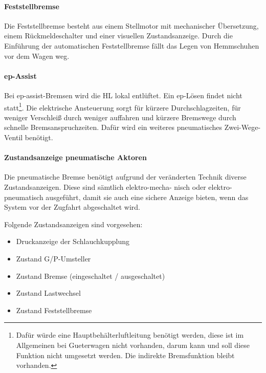 \paragraph{Feststellbremse} Die Feststellbremse besteht aus einem Stellmotor mit mechanischer Übersetzung, einem Rückmeldeschalter und einer visuellen Zustandsanzeige. Durch die Einführung der automatischen Feststellbremse fällt das Legen von \gls{Hemmschuh}en vor dem Wagen weg.

\paragraph{ep-Assist} Bei  \gls{ep-assist-Bremsen} wird die \gls{HL} lokal entlüftet. Ein ep-Lösen findet nicht statt\footnote{Dafür würde eine Hauptbehälterluftleitung benötigt werden, diese ist im Allgemeinen bei \gls{Gueterwagen} nicht vorhanden, darum kann und soll diese Funktion nicht umgesetzt werden. Die indirekte Bremsfunktion bleibt vorhanden.}.  Die elektrische Ansteuerung sorgt für kürzere Durchschlagzeiten, für weniger Verschleiß durch weniger auffahren und kürzere Bremswege durch schnelle Bremsanspruchzeiten. Dafür wird ein weiteres pneumatisches Zwei-Wege-Ventil benötigt.

\paragraph{Zustandsanzeige pneumatische Aktoren}\label{sec:ZustandKupplung}
Die pneumatische Bremse benötigt aufgrund der veränderten Technik diverse Zustandsanzeigen. Diese sind sämtlich elektro-mecha- nisch oder elektro-pneumatisch ausgeführt, damit sie auch eine sichere Anzeige bieten, wenn das System vor der \gls{Zugfahrt} abgeschaltet wird.\par
Folgende Zustandsanzeigen sind vorgesehen:
\begin{itemize}
    \item Druckanzeige der Schlauchkupplung
    \item Zustand G/P-Umsteller
    \item Zustand Bremse (eingeschaltet / ausgeschaltet)
    \item Zustand \gls{Lastwechsel}
    \item Zustand Feststellbremse
\end{itemize}
